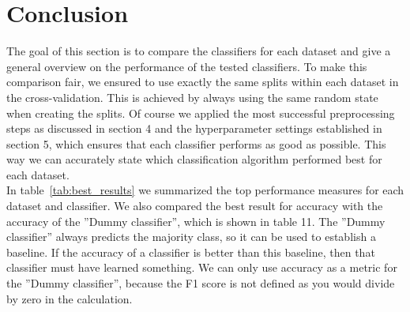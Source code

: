 \documentclass[a4paper,12pt]{article}
\begin{document}
\section{Conclusion}
The goal of this section is to compare the classifiers for each dataset and give a general overview on the
performance of the tested classifiers. To make this comparison fair, we ensured to use exactly the same
splits within each dataset in the cross-validation. This is achieved by always using the same random state
when creating the splits. Of course we applied the most successful preprocessing steps as discussed in
section 4 and the hyperparameter settings established in section 5, which ensures that each classifier
performs as good as possible. This way we can accurately state which classification algorithm performed
best for each dataset.\\
In table~\ref{tab:best_results} we summarized the top performance measures for each dataset and classifier. We also compared
the best result for accuracy with the accuracy of the ”Dummy classifier”, which is shown in table 11.
The ”Dummy classifier” always predicts the majority class, so it can be used to establish a baseline. If
the accuracy of a classifier is better than this baseline, then that classifier must have learned something.
We can only use accuracy as a metric for the ”Dummy classifier”, because the F1 score is not defined as
you would divide by zero in the calculation.
\end{document}

